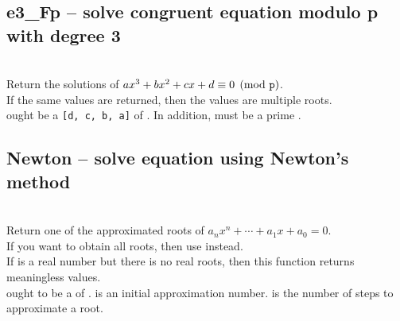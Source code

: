   \subsection{e3\_Fp -- solve congruent equation modulo p with degree 3}
   \\
   \spacing
   \quad Return the solutions of $ax^3 + bx^2 + cx + d  \equiv 0 \pmod{{\texttt p}}$.\\
   \spacing
   \quad If the same values are returned, then the values are multiple roots. \\
   \spacing
   \quad {} ought be a  {\tt [d, c, b, a]} of .
   In addition,  must be a prime . \\
  \subsection{Newton -- solve equation using Newton's method}
   \\
   \spacing
   \quad Return one of the approximated roots of $a_nx^n + \cdots + a_1x + a_0=0$.\\
   \spacing
   \quad If you want to obtain all roots, then use  instead.\\
   \negok If  is a real number but there is no real roots, then this function returns meaningless values. \\
   \spacing
   \quad {} ought to be a  of
   .
    is an initial approximation  number.
    is the number of steps to approximate a root.\\
%
